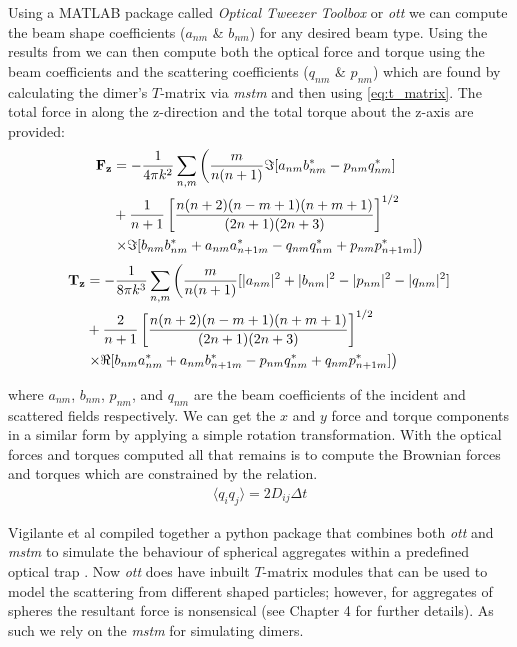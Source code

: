 Using a  MATLAB package called \textit{Optical Tweezer Toolbox} 
or \textit{ott} \cite{Nieminen2007} we can compute the beam 
shape coefficients ($a_{nm}$ \& $b_{nm}$) for any desired beam 
type. Using the results from \cite{Farsund1996} we can then 
compute both the optical force and torque using the beam 
coefficients and the scattering coefficients ($q_{nm}$ \& $p_{nm}$) 
which are found by calculating the dimer's $T$-matrix via \textit{mstm} 
\cite{Mackowski2011} and then using \eqref{eq:t_matrix}. The 
total force in along the z-direction and the total torque about 
the z-axis are provided:
\begin{equation}
	\label{eq:optical_force}
\begin{split}
  \bold{F_z}
  &=
    -\frac{1}{4\pi k^2}\sum_{n,m} \left(\frac{m}{n(n+1)}\Im[a_{nm}b^*_{nm}-p_{nm}q^*_{nm}] \right.
  \\ 
  &+\frac{1}{n+1}\left[\frac{n(n+2)(n-m+1)(n+m+1)}{(2n+1)(2n+3)} \right]^{1/2}
  \\
  & \left.\times\Im[b_{nm}b^*_{nm}+a_{nm}a^*_{n+1m}-q_{nm}q^*_{nm}+p_{nm}p^*_{n+1m}] \right)
\end{split}
\end{equation}
\begin{equation}
\begin{split}
  \bold{T_z}
  &=
    -\frac{1}{8\pi k^3}\sum_{n,m} \left(\frac{m}{n(n+1)}[|a_{nm}|^2+|b_{nm}|^2-|p_{nm}|^2-|q_{nm}|^2] \right.
  \\ 
  &+\frac{2}{n+1}\left[\frac{n(n+2)(n-m+1)(n+m+1)}{(2n+1)(2n+3)} \right]^{1/2}
  \\
  & \left.\times\Re[b_{nm}a^*_{nm}+a_{nm}b^*_{n+1m}-p_{nm}q^*_{nm}+q_{nm}p^*_{n+1m}] \right)
\end{split}
\end{equation}

where $a_{nm}$, $b_{nm}$, $p_{nm}$, and $q_{nm}$ are the beam 
coefficients of the incident and scattered fields respectively. 
We can get the $x$ and $y$ force and torque components in a 
similar form by applying a simple rotation transformation. With 
the optical forces and torques computed all that remains is to 
compute the Brownian forces and torques which are constrained 
by the relation.
\begin{align}
	\langle q_iq_j\rangle =2D_{ij}\Delta t
\end{align}

Vigilante et al compiled together a python package that combines 
both \textit{ott} and \textit{mstm} to simulate the behaviour of 
spherical aggregates within a predefined optical trap 
\cite{Vigilante2020}. Now \textit{ott} does have inbuilt $T$-matrix 
modules that can be used to model the scattering from different 
shaped particles; however, for aggregates of spheres the resultant 
force is nonsensical (see Chapter 4 for further details). As such 
we rely on the \textit{mstm} for simulating dimers.  

